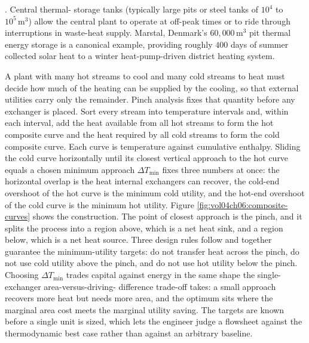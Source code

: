 . Central thermal-
storage tanks (typically large pits or steel tanks of $10^4$ to $10^5
\,\text{m}^3$) allow the central plant to operate at off-peak times
or to ride through interruptions in waste-heat supply. Marstal,
Denmark's $60{,}000\,\text{m}^3$ pit thermal energy storage is a
canonical example, providing roughly $400$ days of summer collected
solar heat to a winter heat-pump-driven district heating system.

\begin{mastery}
A plant with many hot streams to cool and many cold streams to heat
must decide how much of the heating can be supplied by the cooling, so
that external utilities carry only the remainder. Pinch analysis fixes
that quantity before any exchanger is placed.
Sort every stream into temperature intervals and, within each interval,
add the heat available from all hot streams to form the hot composite
curve and the heat required by all cold streams to form the cold
composite curve. Each curve is temperature against cumulative enthalpy.
Sliding the cold curve horizontally until its closest vertical approach
to the hot curve equals a chosen minimum approach $\Delta T_{\min}$ fixes
three numbers at once: the horizontal overlap is the heat internal
exchangers can recover, the cold-end overshoot of the hot curve is the
minimum cold utility, and the hot-end overshoot of the cold curve is the
minimum hot utility. Figure \ref{fig:vol04ch06:composite-curves} shows
the construction. The point of closest approach is the pinch, and it
splits the process into a region above, which is a net heat sink, and a
region below, which is a net heat source. Three design rules follow and
together guarantee the minimum-utility targets: do not transfer heat
across the pinch, do not use cold utility above the pinch, and do not use
hot utility below the pinch. Choosing $\Delta T_{\min}$ trades capital
against energy in the same shape the single-exchanger area-versus-driving-
difference trade-off takes: a small approach recovers more heat but
needs more area, and the optimum sits where the marginal area cost meets
the marginal utility saving. The targets are known before a single unit
is sized, which lets the engineer judge a flowsheet against the
thermodynamic best case rather than against an arbitrary baseline.
\end{mastery}



